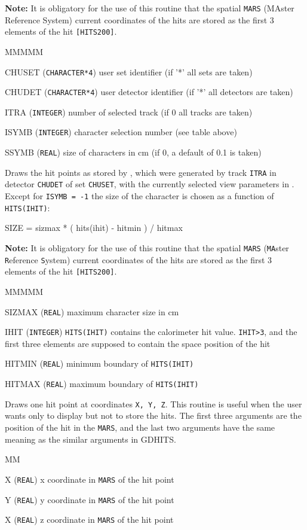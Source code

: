 {\bf Note:}
It is obligatory for the use of this routine that the spatial
{\tt MARS} (MAster Reference System) current coordinates of the hits are stored
as the first 3 elements of the hit {\tt [HITS200]}.
\begin{DLtt}{MMMMM}
\item[CHUSET] ({\tt CHARACTER*4}) user set identifier (if '*' all sets are taken)
\item[CHUDET] ({\tt CHARACTER*4}) user detector identifier (if '*' all 
detectors are taken)
\item[ITRA]   ({\tt INTEGER}) number of selected track (if 0 all tracks are taken)
\item[ISYMB]  ({\tt INTEGER}) character selection number (see table above)
\item[SSYMB]  ({\tt REAL}) size of characters in cm (if 0, a default of 
0.1 is taken)
\end{DLtt}
Draws the hit points as stored by , which were
generated by track {\tt ITRA} in detector {\tt CHUDET} of set {\tt CHUSET},
with the currently selected view parameters in .
Except for {\tt ISYMB = -1} the size of the character
is chosen as a function of {\tt HITS(IHIT)}:
\begin{center}
\ttfamily SIZE = sizmax * ( hits(ihit) - hitmin ) / hitmax
\end{center}

{\bf Note:}
It is obligatory for the use of this routine that the spatial
{\tt MARS} ({\tt MA}ster {\tt R}eference {\tt S}ystem) current coordinates 
of the hits are stored as the first 3 elements of the hit {\tt [HITS200]}.
\begin{DLtt}{MMMMM}
\item [SIZMAX]   ({\tt REAL}) maximum character size in cm
\item [IHIT]     ({\tt INTEGER}) {\tt HITS(IHIT)} contains the calorimeter 
hit value. {\tt IHIT>3}, and the first three elements are supposed to
contain the space position of the hit
\item [HITMIN]    ({\tt REAL}) minimum boundary of {\tt HITS(IHIT)}
\item[HITMAX]     ({\tt REAL}) maximum boundary of {\tt HITS(IHIT)}
\end{DLtt}
Draws one hit point at coordinates {\tt X, Y, Z}. This routine is useful
when the user wants only to display but not to store the hits.
The first three arguments are the position of the hit in the {\tt MARS},
and the last two arguments have the same meaning as the similar 
arguments in GDHITS.
\begin{DLtt}{MM}
\item [X]  ({\tt REAL})       x coordinate in {\tt MARS} of the hit point
\item [Y]  ({\tt REAL})       y coordinate in {\tt MARS} of the hit point
\item [X]  ({\tt REAL})       z coordinate in {\tt MARS} of the hit point
\end{DLtt}

